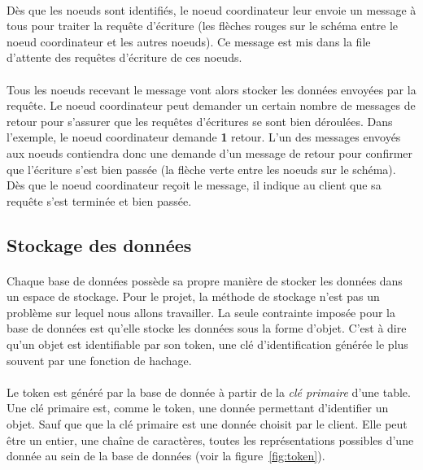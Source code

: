 \documentclass[12pt]{article}
\begin{document}
\paragraph{} Dès que les noeuds sont identifiés, le noeud coordinateur leur envoie un message à tous pour traiter la requête d'écriture (les flèches rouges sur le schéma entre le noeud coordinateur et les autres noeuds). Ce message est mis dans la file d'attente des requêtes d'écriture de ces noeuds.

\paragraph{} Tous les noeuds recevant le message vont alors stocker les données envoyées par la requête. Le noeud coordinateur peut demander un certain nombre de messages de retour pour s'assurer que les requêtes d'écritures se sont bien déroulées. Dans l'exemple, le noeud coordinateur demande \textbf{1} retour. L'un des messages envoyés aux noeuds contiendra donc une demande d'un message de retour pour confirmer que l'écriture s'est bien passée (la flèche verte entre les noeuds sur le schéma). Dès que le noeud coordinateur reçoit le message, il indique au client que sa requête s'est terminée et bien passée.

\subsection{Stockage des données}

\paragraph{} Chaque base de données possède sa propre manière de stocker les données dans un espace de stockage. Pour le projet, la méthode de stockage n'est pas un problème sur lequel nous allons travailler. La seule contrainte imposée pour la base de données est qu'elle stocke les données sous la forme d'objet. C'est à dire qu'un objet est identifiable par son token, une clé d'identification générée le plus souvent par une fonction de hachage.

\paragraph{} Le token est généré par la base de donnée à partir de la \textit{clé primaire} d'une table. Une clé primaire est, comme le token, une donnée permettant d'identifier un objet. Sauf que que la clé primaire est une donnée choisit par le client. Elle peut être un entier, une chaîne de caractères, toutes les représentations possibles d'une donnée au sein de la base de données (voir la figure~\ref{fig:token}).
\end{document}
